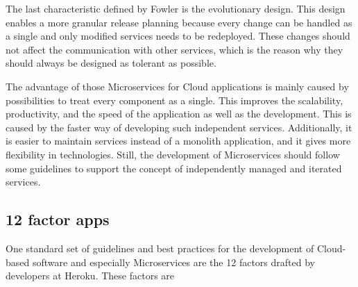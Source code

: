 \documentclass[12pt,english,a4paper,oneside,,tablecaptionabove]{scrbook}
\begin{document}
The last characteristic defined by Fowler is the evolutionary design.
This design enables a more granular release planning because every
change can be handled as a single and only modified services needs to be
redeployed. These changes should not affect the communication with other
services, which is the reason why they should always be designed as
tolerant as possible.

The advantage of those Microservices for Cloud applications is mainly
caused by possibilities to treat every component as a single. This
improves the scalability, productivity, and the speed of the application
as well as the development. This is caused by the faster way of
developing such independent services. Additionally, it is easier to
maintain services instead of a monolith application, and it gives more
flexibility in technologies. Still, the development of Microservices
should follow some guidelines to support the concept of independently
managed and iterated services.

\hypertarget{factor-apps}{%
\subsection{12 factor apps}\label{factor-apps}}

One standard set of guidelines and best practices for the development of
Cloud-based software and especially Microservices are the 12 factors
drafted by developers at Heroku. These factors are
\end{document}
